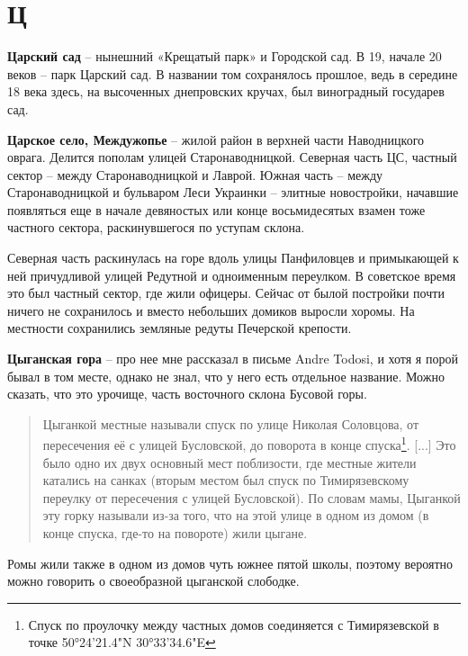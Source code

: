 \chapter*{Ц}

\textbf{Царский сад} – нынешний «Крещатый парк» и Городской сад. В 19, начале 20 веков – парк Царский сад. В названии том сохранялось прошлое, ведь в середине 18 века здесь, на высоченных днепровских кручах, был виноградный государев сад.\\

\medskip

\textbf{Царское село, Междужопье} – жилой район в верхней части Наводницкого оврага. Делится пополам улицей Старонаводницкой. Северная часть ЦС, частный сектор – между Старонаводницкой и Лаврой. Южная часть – между Старонаводницкой и бульваром Леси Украинки – элитные новостройки, начавшие появляться еще в начале девяностых или конце восьмидесятых взамен тоже частного сектора, раскинувшегося по уступам склона.

Северная часть раскинулась на горе вдоль улицы Панфиловцев и примыкающей к ней причудливой улицей Редутной и одноименным переулком. В советское время это был частный сектор, где жили офицеры. Сейчас от былой постройки почти ничего не сохранилось и вместо небольших домиков выросли хоромы. На местности сохранились земляные редуты Печерской крепости.\\

\medskip

\textbf{Цыганская гора} – про нее мне рассказал в письме Andre Todosi, и хотя я порой бывал в том месте, однако не знал, что у него есть отдельное название. Можно сказать, что это урочище, часть восточного склона Бусовой горы.

\begin{quotation}
Цыганкой местные называли спуск по улице Николая Соловцова, от пересечения её с улицей Бусловской, до поворота в конце спуска\footnote{Спуск по проулочку между частных домов соединяется с Тимирязевской в точке 50°24'21.4"N 30°33'34.6"E}. [...] Это было одно их двух основный мест поблизости, где местные жители катались на санках (вторым
местом был спуск по Тимирязевскому переулку от пересечения с улицей Бусловской). По словам мамы, Цыганкой эту горку называли из-за того, что на этой улице в одном из домом (в конце спуска, где-то на повороте) жили цыгане.
\end{quotation}

Ромы жили также в одном из домов чуть южнее пятой школы, поэтому вероятно можно говорить о своеобразной цыганской слободке.\\


